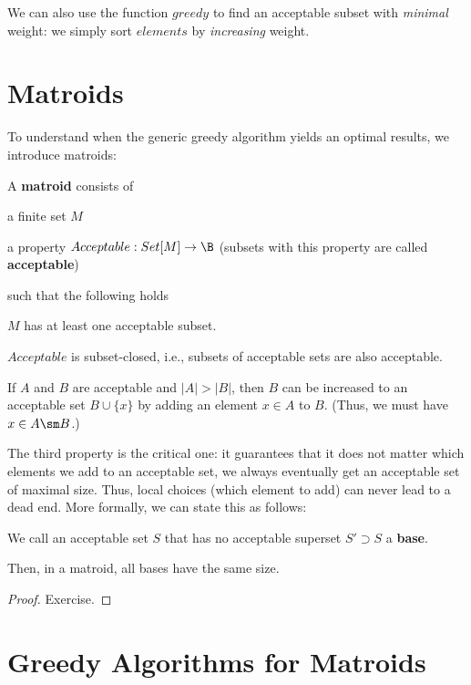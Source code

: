 We can also use the function $greedy$ to find an acceptable subset with \emph{minimal} weight: we simply sort $elements$ by \emph{increasing} weight.

\section{Matroids}

To understand when the generic greedy algorithm yields an optimal results, we introduce matroids:

\begin{definition}[Matroid]
A \textbf{matroid} consists of
\begin{compactitem}
\item a finite set $M$
\item a property $Acceptable:Set[M]\to\B$ (subsets with this property are called \textbf{acceptable})
\end{compactitem}
such that the following holds
\begin{compactitem}
 \item $M$ has at least one acceptable subset.
 \item $Acceptable$ is subset-closed, i.e., subsets of acceptable sets are also acceptable.
 \item If $A$ and $B$ are acceptable and $|A|>|B|$, then $B$ can be increased to an acceptable set $B\cup\{x\}$ by adding an element $x\in A$ to $B$. (Thus, we must have $x\in A\sm B$.)
\end{compactitem}
\end{definition}

The third property is the critical one: it guarantees that it does not matter which elements we add to an acceptable set, we always eventually get an acceptable set of maximal size.
Thus, local choices (which element to add) can never lead to a dead end.
More formally, we can state this as follows:
\begin{theorem}
We call an acceptable set $S$ that has no acceptable superset $S'\supset S$ a \textbf{base}.

Then, in a matroid, all bases have the same size.
\end{theorem}
\begin{proof}
Exercise.
\end{proof}

\section{Greedy Algorithms for Matroids}


